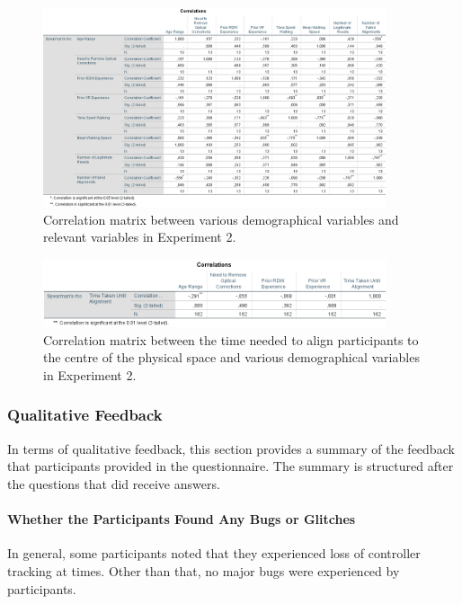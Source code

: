 \begin{figure}
    \centering
    \includegraphics[width=0.9\textwidth]{figures/graphs/Ex2Correlations1.png}
    \caption[Demographical Correlation Matrix 1 for Experiment 2]{Correlation matrix between various demographical variables and relevant variables in Experiment 2.}
    \label{fig:ex2correlation1}
\end{figure}

\begin{figure}[tbph]
    \centering
    \includegraphics[width=0.9\textwidth]{figures/graphs/Ex2Correlations2.png}
    \caption[Demographical Correlation Matrix 2 for Experiment 2]{Correlation matrix between the time needed to align participants to the centre of the physical space and various demographical variables in Experiment 2.}
    \label{fig:ex2correlation2}
\end{figure}

\subsubsection{Qualitative Feedback}
In terms of qualitative feedback, this section provides a summary of the feedback that participants provided in the questionnaire. The summary is structured after the questions that did receive answers.

\paragraph{Whether the Participants Found Any Bugs or Glitches}
In general, some participants noted that they experienced loss of controller tracking at times. Other than that, no major bugs were experienced by participants.

